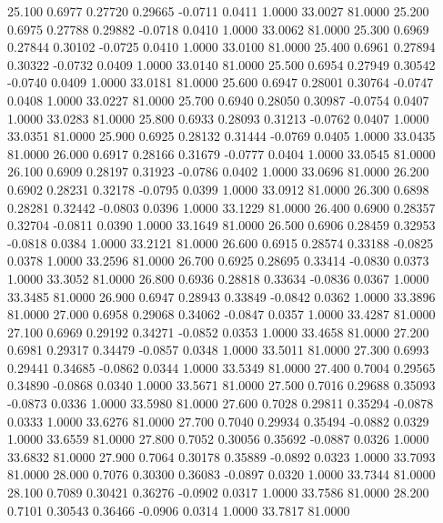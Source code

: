   25.100   0.6977   0.27720   0.29665  -0.0711   0.0411   1.0000  33.0027  81.0000
  25.200   0.6975   0.27788   0.29882  -0.0718   0.0410   1.0000  33.0062  81.0000
  25.300   0.6969   0.27844   0.30102  -0.0725   0.0410   1.0000  33.0100  81.0000
  25.400   0.6961   0.27894   0.30322  -0.0732   0.0409   1.0000  33.0140  81.0000
  25.500   0.6954   0.27949   0.30542  -0.0740   0.0409   1.0000  33.0181  81.0000
  25.600   0.6947   0.28001   0.30764  -0.0747   0.0408   1.0000  33.0227  81.0000
  25.700   0.6940   0.28050   0.30987  -0.0754   0.0407   1.0000  33.0283  81.0000
  25.800   0.6933   0.28093   0.31213  -0.0762   0.0407   1.0000  33.0351  81.0000
  25.900   0.6925   0.28132   0.31444  -0.0769   0.0405   1.0000  33.0435  81.0000
  26.000   0.6917   0.28166   0.31679  -0.0777   0.0404   1.0000  33.0545  81.0000
  26.100   0.6909   0.28197   0.31923  -0.0786   0.0402   1.0000  33.0696  81.0000
  26.200   0.6902   0.28231   0.32178  -0.0795   0.0399   1.0000  33.0912  81.0000
  26.300   0.6898   0.28281   0.32442  -0.0803   0.0396   1.0000  33.1229  81.0000
  26.400   0.6900   0.28357   0.32704  -0.0811   0.0390   1.0000  33.1649  81.0000
  26.500   0.6906   0.28459   0.32953  -0.0818   0.0384   1.0000  33.2121  81.0000
  26.600   0.6915   0.28574   0.33188  -0.0825   0.0378   1.0000  33.2596  81.0000
  26.700   0.6925   0.28695   0.33414  -0.0830   0.0373   1.0000  33.3052  81.0000
  26.800   0.6936   0.28818   0.33634  -0.0836   0.0367   1.0000  33.3485  81.0000
  26.900   0.6947   0.28943   0.33849  -0.0842   0.0362   1.0000  33.3896  81.0000
  27.000   0.6958   0.29068   0.34062  -0.0847   0.0357   1.0000  33.4287  81.0000
  27.100   0.6969   0.29192   0.34271  -0.0852   0.0353   1.0000  33.4658  81.0000
  27.200   0.6981   0.29317   0.34479  -0.0857   0.0348   1.0000  33.5011  81.0000
  27.300   0.6993   0.29441   0.34685  -0.0862   0.0344   1.0000  33.5349  81.0000
  27.400   0.7004   0.29565   0.34890  -0.0868   0.0340   1.0000  33.5671  81.0000
  27.500   0.7016   0.29688   0.35093  -0.0873   0.0336   1.0000  33.5980  81.0000
  27.600   0.7028   0.29811   0.35294  -0.0878   0.0333   1.0000  33.6276  81.0000
  27.700   0.7040   0.29934   0.35494  -0.0882   0.0329   1.0000  33.6559  81.0000
  27.800   0.7052   0.30056   0.35692  -0.0887   0.0326   1.0000  33.6832  81.0000
  27.900   0.7064   0.30178   0.35889  -0.0892   0.0323   1.0000  33.7093  81.0000
  28.000   0.7076   0.30300   0.36083  -0.0897   0.0320   1.0000  33.7344  81.0000
  28.100   0.7089   0.30421   0.36276  -0.0902   0.0317   1.0000  33.7586  81.0000
  28.200   0.7101   0.30543   0.36466  -0.0906   0.0314   1.0000  33.7817  81.0000
